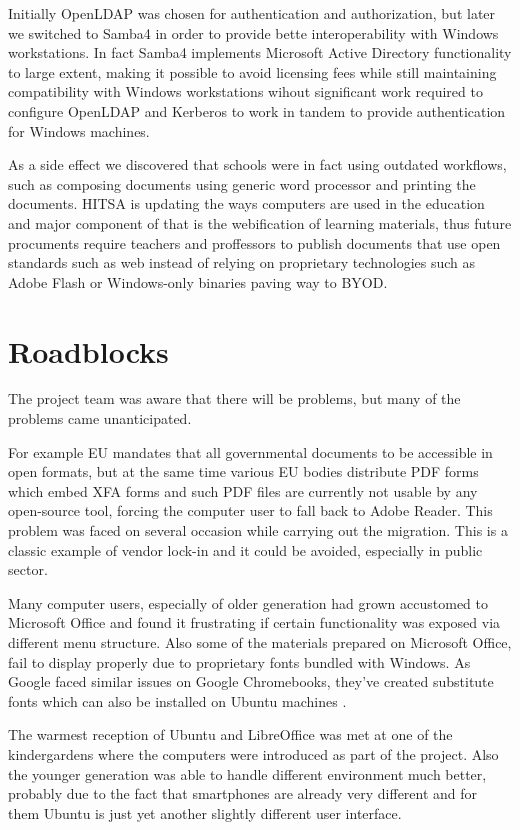 \documentclass{article}
\begin{document}
Initially OpenLDAP was chosen for authentication and authorization,
but later we switched to Samba4 in order to provide bette
interoperability with Windows workstations.
In fact Samba4 implements Microsoft Active Directory functionality
to large extent,
making it possible to avoid licensing fees while still maintaining
compatibility with Windows workstations wihout
significant work required to configure OpenLDAP and Kerberos to
work in tandem to provide authentication for Windows machines.

As a side effect we discovered that schools were in fact
using outdated workflows, such as composing documents using
generic word processor and printing the documents.
HITSA is updating the ways computers are used in the education
and major component of that is the webification of 
learning materials, thus future procuments require
teachers and proffessors to publish documents that
use open standards such as web instead of relying on
proprietary technologies such as Adobe Flash or
Windows-only binaries paving way to BYOD.

\section{Roadblocks}

The project team was aware that there will be problems,
but many of the problems came unanticipated.

For example EU mandates that all governmental documents to
be accessible in open formats, but at the same time
various EU bodies distribute PDF forms which
embed XFA forms and such PDF files are currently not
usable by any open-source tool, forcing the computer
user to fall back to Adobe Reader.
This problem was faced on several occasion while
carrying out the migration.
This is a classic example of vendor lock-in and
it could be avoided, especially in public sector.

Many computer users, especially of older generation
had grown accustomed to 
Microsoft Office and found it frustrating
if certain functionality was exposed
via different menu structure.
Also some of the materials prepared on Microsoft Office,
fail to display properly due to proprietary fonts
bundled with Windows.
As Google faced similar issues on Google Chromebooks,
they've created substitute fonts which can also be installed
on Ubuntu machines \cite{substituting-fonts}.

The warmest reception of Ubuntu and LibreOffice
was met at one of the kindergardens where the computers were
introduced as part of the project.
Also the younger generation was able to handle
different environment much better,
probably due to the fact that smartphones
are already very different and for them Ubuntu
is just yet another slightly different user interface.
\end{document}
